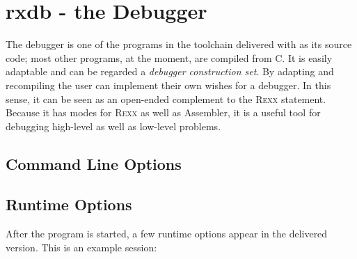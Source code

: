\chapter{rxdb - the \crexx{} Debugger}\label{debugger}
The debugger is one of the programs in the toolchain delivered with \crexx{}
as its source code; most other programs, at the moment, are compiled
from C. It is easily adaptable and can be regarded a \emph{debugger
  construction set}. By adapting and recompiling the user can
implement their own wishes for a debugger. In this sense, it can be
seen as an open-ended complement to the \textsc{Rexx} 
statement. Because it has modes for \textsc{Rexx} as well as
 Assembler, it is a useful tool for debugging
high-level as well as low-level problems.
\section{Command Line Options}
\begin{shaded}
  \small
  \obeylines {}
 \end{shaded}
\section{Runtime Options}
After the  program is started, a few runtime options appear in the
delivered version. This is an example session:
